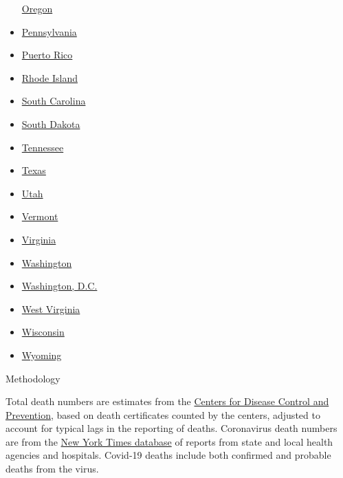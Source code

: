 \begin{itemize}
  \href{https://www.nytimes.com/interactive/2020/us/oregon-coronavirus-cases.html}{Oregon}
\item
  \href{https://www.nytimes.com/interactive/2020/us/pennsylvania-coronavirus-cases.html}{Pennsylvania}
\item
  \href{https://www.nytimes.com/interactive/2020/us/puerto-rico-coronavirus-cases.html}{Puerto
  Rico}
\item
  \href{https://www.nytimes.com/interactive/2020/us/rhode-island-coronavirus-cases.html}{Rhode
  Island}
\item
  \href{https://www.nytimes.com/interactive/2020/us/south-carolina-coronavirus-cases.html}{South
  Carolina}
\item
  \href{https://www.nytimes.com/interactive/2020/us/south-dakota-coronavirus-cases.html}{South
  Dakota}
\item
  \href{https://www.nytimes.com/interactive/2020/us/tennessee-coronavirus-cases.html}{Tennessee}
\item
  \href{https://www.nytimes.com/interactive/2020/us/texas-coronavirus-cases.html}{Texas}
\item
  \href{https://www.nytimes.com/interactive/2020/us/utah-coronavirus-cases.html}{Utah}
\item
  \href{https://www.nytimes.com/interactive/2020/us/vermont-coronavirus-cases.html}{Vermont}
\item
  \href{https://www.nytimes.com/interactive/2020/us/virginia-coronavirus-cases.html}{Virginia}
\item
  \href{https://www.nytimes.com/interactive/2020/us/washington-coronavirus-cases.html}{Washington}
\item
  \href{https://www.nytimes.com/interactive/2020/us/washington-dc-coronavirus-cases.html}{Washington,
  D.C.}
\item
  \href{https://www.nytimes.com/interactive/2020/us/west-virginia-coronavirus-cases.html}{West
  Virginia}
\item
  \href{https://www.nytimes.com/interactive/2020/us/wisconsin-coronavirus-cases.html}{Wisconsin}
\item
  \href{https://www.nytimes.com/interactive/2020/us/wyoming-coronavirus-cases.html}{Wyoming}
\end{itemize}

Methodology

Total death numbers are estimates from the
\href{https://www.cdc.gov/nchs/nvss/vsrr/covid19/excess_deaths.htm}{Centers
for Disease Control and Prevention}, based on death certificates counted
by the centers, adjusted to account for typical lags in the reporting of
deaths. Coronavirus death numbers are from the
\href{https://www.nytimes.com/interactive/2020/us/coronavirus-us-cases.html}{New
York Times database} of reports from state and local health agencies and
hospitals. Covid-19 deaths include both confirmed and probable deaths
from the virus.

